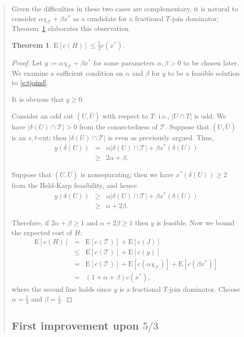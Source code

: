 \documentclass[11pt,letterpaper]{article}
\newtheorem{thm}{Theorem}
\newcommand{\E}{\mathrm{E}}
\begin{document}
\begin{quote}
Given the difficulties in these two cases are complementary, it is natural to consider $\alpha \chi_{\mathscr{T}} + \beta x^*$ as a candidate for a fractional $T$-join dominator; Theorem~\ref{t:a53} elaborates this observation.

\begin{thm}\label{t:a53}
$\E[c(H)]\leq\frac{5}{3}c(x^*)$.
\end{thm}
\begin{proof}
Let $y:=\alpha \chi_{\mathscr{T}} + \beta x^*$ for some parameters $\alpha,\beta>0$ to be chosen later. We examine a sufficient condition on $\alpha$ and $\beta$ for $y$ to be a feasible solution to \eqref{e:tjoind}.

It is obvious that $y\geq 0$.

Consider an odd cut $(U,\bar U)$ with respect to $T$: i.e., $|U\cap T|$ is odd. We have $|\delta(U)\cap \mathscr{T}|>0$ from the connectedness of $\mathscr{T}$. Suppose that $(U,\bar U)$ is an $s,t$-cut; then $|\delta(U)\cap \mathscr{T}|$ is even as previously argued. Thus,\begin{eqnarray*}
y(\delta(U)) &=& \alpha |\delta(U)\cap \mathscr{T}|+\beta x^*(\delta(U))\\
&\geq& 2\alpha + \beta
.\end{eqnarray*}

Suppose that $(U,\bar U)$ is nonseparating; then we have $x^*(\delta(U))\geq 2$ from the Held-Karp feasibility, and hence\begin{eqnarray*}
y(\delta(U))&\geq&\alpha|\delta(U)\cap \mathscr{T}|+\beta x^*(\delta(U))\\
&\geq&\alpha+2\beta
.\end{eqnarray*}

Therefore, if $2\alpha+\beta\geq 1$ and $\alpha+2\beta\geq 1$ then $y$ is feasible.
Now we bound the expected cost of $H$:
\begin{eqnarray*}
\E[c(H)] &=& \E[c(\mathscr{T})] + \E[c(J)]\\
&\leq& \E[c(\mathscr{T})] + \E[c(y)]\\
&=& \E[c(\mathscr{T})] + \E[c(\alpha\chi_{\mathscr{T}})] + \E[c(\beta x^*)]\\
&=& (1+\alpha+\beta)c(x^*)
,\end{eqnarray*}where the second line holds since $y$ is a fractional $T$-join dominator. Choose $\alpha=\frac{1}{3}$ and $\beta=\frac{1}{3}$.
\end{proof}

\subsection{First improvement upon $5/3$}


\end{quote}
\end{document}
